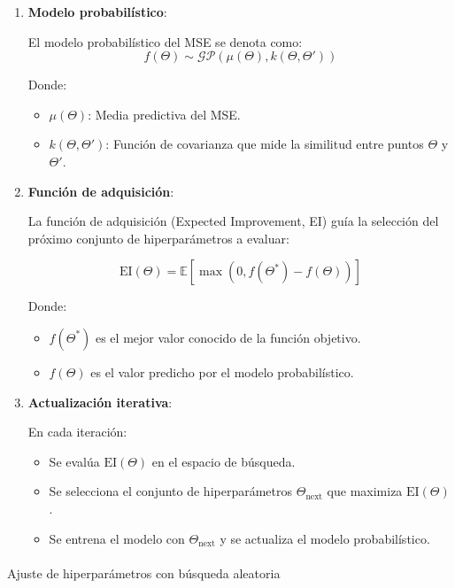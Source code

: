 \documentclass[
  12pt,
  letterpaper,
  DIV=11,
  numbers=noendperiod]{scrartcl}
\makeatletter
\let\oldparagraph\paragraph
\renewcommand{\paragraph}{
    \@ifstar
      \xxxParagraphStar
      \xxxParagraphNoStar
  }
\newcommand{\xxxParagraphStar}[1]{\oldparagraph*{#1}\mbox{}}
\newcommand{\xxxParagraphNoStar}[1]{\oldparagraph{#1}\mbox{}}
\makeatother
\begin{document}
\begin{enumerate}
\def\labelenumi{\arabic{enumi}.}
\item
  \textbf{Modelo probabilístico}:

  El modelo probabilístico del MSE se denota como: \[
  f(\Theta) \sim \mathcal{GP}(\mu(\Theta), k(\Theta, \Theta'))
  \]

  Donde:

  \begin{itemize}
  \item
    \(\mu(\Theta)\): Media predictiva del MSE.
  \item
    \(k(\Theta, \Theta')\): Función de covarianza que mide la similitud
    entre puntos \(\Theta\) y \(\Theta'\).
  \end{itemize}
\item
  \textbf{Función de adquisición}:

  La función de adquisición (Expected Improvement, EI) guía la selección
  del próximo conjunto de hiperparámetros a evaluar:

  \[
  \text{EI}(\Theta) = \mathbb{E}\left[ \max(0, f(\Theta^*) - f(\Theta)) \right]
  \]

  Donde:

  \begin{itemize}
  \item
    \(f(\Theta^*)\) es el mejor valor conocido de la función objetivo.
  \item
    \(f(\Theta)\) es el valor predicho por el modelo probabilístico.
  \end{itemize}
\item
  \textbf{Actualización iterativa}:

  En cada iteración:

  \begin{itemize}
  \item
    Se evalúa \(\text{EI}(\Theta)\) en el espacio de búsqueda.
  \item
    Se selecciona el conjunto de hiperparámetros
    \(\Theta_{\text{next}}\) que maximiza \(\text{EI}(\Theta)\).
  \item
    Se entrena el modelo con \(\Theta_{\text{next}}\) y se actualiza el
    modelo probabilístico.
  \end{itemize}
\end{enumerate}

\paragraph{Ajuste de hiperparámetros con búsqueda
aleatoria}\label{ajuste-de-hiperparuxe1metros-con-buxfasqueda-aleatoria-1}
\end{document}
